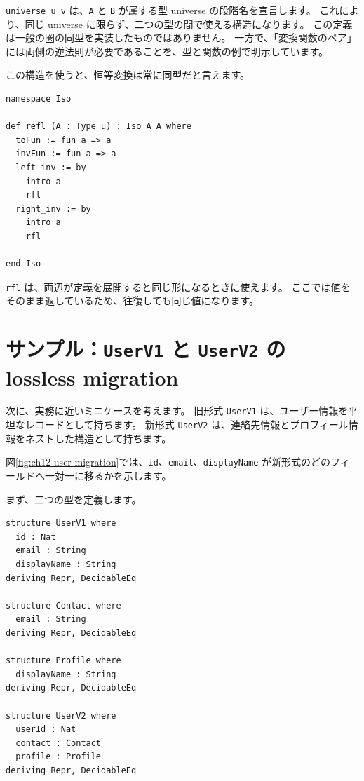\texttt{universe u v} は、\texttt{A} と \texttt{B} が属する型 universe の段階名を宣言します。
これにより、同じ universe に限らず、二つの型の間で使える構造になります。
この定義は一般の圏の同型を実装したものではありません。
一方で、「変換関数のペア」には両側の逆法則が必要であることを、型と関数の例で明示しています。

この構造を使うと、恒等変換は常に同型だと言えます。

\begin{listing}[htbp]
\begin{verbatim}
namespace Iso

def refl (A : Type u) : Iso A A where
  toFun := fun a => a
  invFun := fun a => a
  left_inv := by
    intro a
    rfl
  right_inv := by
    intro a
    rfl

end Iso
\end{verbatim}
\caption{\texttt{Iso.refl}}
\label{lst:ch12_iso_refl}
\end{listing}

\texttt{rfl} は、両辺が定義を展開すると同じ形になるときに使えます。
ここでは値をそのまま返しているため、往復しても同じ値になります。

\section{サンプル：\texttt{UserV1} と \texttt{UserV2} の lossless migration}
\label{sec:ch12-user-migration}

次に、実務に近いミニケースを考えます。
旧形式 \texttt{UserV1} は、ユーザー情報を平坦なレコードとして持ちます。
新形式 \texttt{UserV2} は、連絡先情報とプロフィール情報をネストした構造として持ちます。

図\ref{fig:ch12-user-migration}では、\texttt{id}、\texttt{email}、\texttt{displayName} が新形式のどのフィールドへ一対一に移るかを示します。


まず、二つの型を定義します。

\begin{listing}[htbp]
\begin{verbatim}
structure UserV1 where
  id : Nat
  email : String
  displayName : String
deriving Repr, DecidableEq

structure Contact where
  email : String
deriving Repr, DecidableEq

structure Profile where
  displayName : String
deriving Repr, DecidableEq

structure UserV2 where
  userId : Nat
  contact : Contact
  profile : Profile
deriving Repr, DecidableEq
\end{verbatim}
\caption{\texttt{UserV1} と \texttt{UserV2}}
\label{lst:ch12_user_types}
\end{listing}

